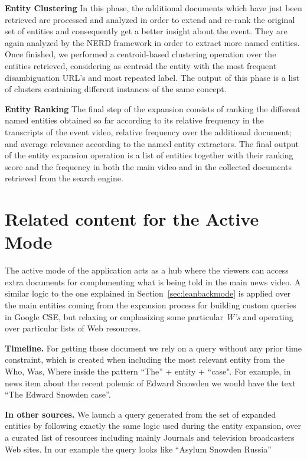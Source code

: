 \documentclass{llncs}
\begin{document}
\textbf{Entity Clustering}
In this phase, the additional documents which have just been retrieved are processed and analyzed in order to extend and re-rank the original set of entities and consequently get a better insight about the event. They are again analyzed by the NERD framework in order to extract more named entities. Once finished, we performed a centroid-based clustering operation over the entities retrieved, considering as centroid the entity with the most frequent disambiguation URL's and most repeated label. The output of this phase is a list of clusters containing different instances of the same concept.

\textbf{Entity Ranking}
The final step of the expansion consists of ranking the different named entities obtained so far according to its relative frequency in the transcripts of the event video, relative frequency over the additional document; and average relevance according to the named entity extractors. The final output of the entity expansion operation is a list of entities together with their ranking score and the frequency in both the main video and in the collected documents retrieved from the search engine.

\section{Related content for the Active Mode}
\label{sec:leanforwardmode}
The active mode of the application acts as a hub where the viewers can access extra documents for complementing what is being told in the main news video. A similar logic to the one explained in Section~\ref{sec:leanbackmode} is applied over the main entities coming from the expansion process for building custom queries in Google CSE, but relaxing or emphasizing some particular \emph{W's} and operating over particular lists of Web resources.

\textbf{Timeline.} For getting those document we rely on a query without any prior time constraint, which is created when including the most relevant entity from the Who, Was, Where inside the pattern ``The'' + entity + ``case". For example, in news item about the recent polemic of Edward Snowden we would have the text ``The Edward Snowden case''.

\textbf{In other sources.} We launch a query generated from the set of expanded entities by following exactly the same logic used during the entity expansion, over a curated list of resources including mainly Journals and television broadcasters Web sites. In our example the query looks like ``Asylum Snowden Russia''
\end{document}
